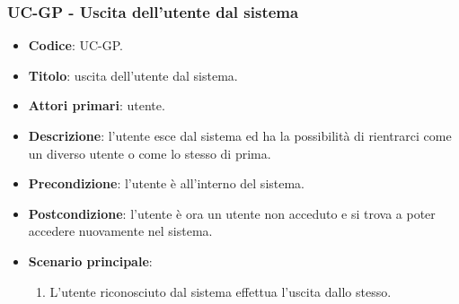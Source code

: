 \subsubsection{UC\theuccount-GP - Uscita dell'utente dal sistema}
	\begin{itemize}
		\item \textbf{Codice}: UC\theuccount-GP.
		\item \textbf{Titolo}: uscita dell'utente dal sistema.
		\item \textbf{Attori primari}: utente.
		\item \textbf{Descrizione}: l'utente esce dal sistema ed ha la possibilità di rientrarci come	un diverso utente o come lo stesso di prima.
		\item \textbf{Precondizione}: l'utente è all'interno del sistema.
		\item \textbf{Postcondizione}: l'utente è ora un utente non acceduto e si trova a poter accedere nuovamente nel sistema.
		\item \textbf{Scenario principale}:
		\begin{enumerate}
			\item L'utente riconosciuto dal sistema effettua l'uscita dallo stesso.
		\end{enumerate}
	\end{itemize}